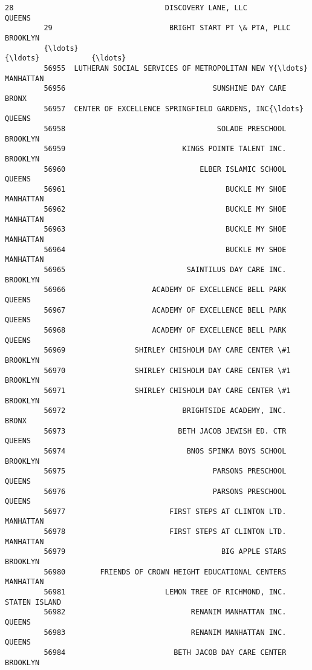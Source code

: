 \documentclass[11pt]{article}
\begin{document}
\begin{Verbatim}[commandchars=\\\{\}]
         28                                   DISCOVERY LANE, LLC         QUEENS   
         29                           BRIGHT START PT \& PTA, PLLC       BROOKLYN   
         {\ldots}                                                  {\ldots}            {\ldots}   
         56955  LUTHERAN SOCIAL SERVICES OF METROPOLITAN NEW Y{\ldots}      MANHATTAN   
         56956                                  SUNSHINE DAY CARE          BRONX   
         56957  CENTER OF EXCELLENCE SPRINGFIELD GARDENS, INC{\ldots}         QUEENS   
         56958                                   SOLADE PRESCHOOL       BROOKLYN   
         56959                           KINGS POINTE TALENT INC.       BROOKLYN   
         56960                               ELBER ISLAMIC SCHOOL         QUEENS   
         56961                                     BUCKLE MY SHOE      MANHATTAN   
         56962                                     BUCKLE MY SHOE      MANHATTAN   
         56963                                     BUCKLE MY SHOE      MANHATTAN   
         56964                                     BUCKLE MY SHOE      MANHATTAN   
         56965                            SAINTILUS DAY CARE INC.       BROOKLYN   
         56966                    ACADEMY OF EXCELLENCE BELL PARK         QUEENS   
         56967                    ACADEMY OF EXCELLENCE BELL PARK         QUEENS   
         56968                    ACADEMY OF EXCELLENCE BELL PARK         QUEENS   
         56969                SHIRLEY CHISHOLM DAY CARE CENTER \#1       BROOKLYN   
         56970                SHIRLEY CHISHOLM DAY CARE CENTER \#1       BROOKLYN   
         56971                SHIRLEY CHISHOLM DAY CARE CENTER \#1       BROOKLYN   
         56972                           BRIGHTSIDE ACADEMY, INC.          BRONX   
         56973                          BETH JACOB JEWISH ED. CTR         QUEENS   
         56974                            BNOS SPINKA BOYS SCHOOL       BROOKLYN   
         56975                                  PARSONS PRESCHOOL         QUEENS   
         56976                                  PARSONS PRESCHOOL         QUEENS   
         56977                        FIRST STEPS AT CLINTON LTD.      MANHATTAN   
         56978                        FIRST STEPS AT CLINTON LTD.      MANHATTAN   
         56979                                    BIG APPLE STARS       BROOKLYN   
         56980        FRIENDS OF CROWN HEIGHT EDUCATIONAL CENTERS      MANHATTAN   
         56981                       LEMON TREE OF RICHMOND, INC.  STATEN ISLAND   
         56982                             RENANIM MANHATTAN INC.         QUEENS   
         56983                             RENANIM MANHATTAN INC.         QUEENS   
         56984                         BETH JACOB DAY CARE CENTER       BROOKLYN   
         

\end{Verbatim}
\end{document}
